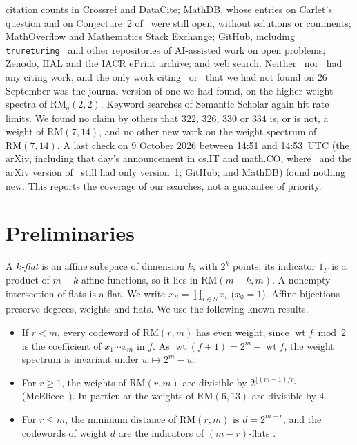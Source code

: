 \documentclass[11pt]{article}
\theoremstyle{remark}
\newcommand{\RM}{\mathrm{RM}}
\DeclareMathOperator{\wt}{wt}
\begin{document}
citation counts in Crossref and DataCite; MathDB, whose entries on Carlet's
question and on Conjecture~2 of~\cite{lw} were still open, without solutions
or comments; MathOverflow and Mathematics Stack Exchange; GitHub, including
\texttt{trureturing}~\cite{tru} and other repositories of AI-assisted work on
open problems; Zenodo, HAL and the IACR ePrint archive; and web search.
Neither~\cite{la} nor~\cite{lw2} had any citing work, and the only work
citing~\cite{lw} or~\cite{c24} that we had not found on 26 September was the
journal version of one we had found, on the higher weight spectra of
$\RM_q(2,2)$. Keyword searches of Semantic Scholar again hit rate limits. We
found no claim by others that $322$, $326$, $330$ or $334$ is, or is not, a
weight of $\RM(7,14)$, and no other new work on the weight spectrum of
$\RM(7,14)$. A last check on 9 October 2026 between 14:51 and 14:53~UTC (the
arXiv, including that day's announcement in cs.IT and math.CO, where~\cite{la}
and the arXiv version of~\cite{lw} still had only version~1; GitHub; and
MathDB) found nothing new.
This reports the coverage of our searches, not a guarantee of priority.

\section{Preliminaries}\label{sec:prelim}
A \emph{$k$-flat} is an affine subspace of dimension $k$, with $2^k$ points; its
indicator $1_F$ is a product of $m-k$ affine functions, so it lies in
$\RM(m-k,m)$. A nonempty intersection of flats is a flat. We write
$x_S=\prod_{i\in S}x_i$ ($x_\emptyset=1$). Affine bijections preserve degrees,
weights and flats. We use the following known results.

{\setlength{\leftmargini}{3.2em}%
\begin{itemize}
\item[(P1)] If $r<m$, every codeword of $\RM(r,m)$ has even weight, since
$\wt f\bmod2$ is the coefficient of $x_1\cdots x_m$ in $f$. As
$\wt(f+1)=2^m-\wt f$, the weight spectrum is invariant under $w\mapsto2^m-w$.
\item[(P2)] For $r\ge1$, the weights of $\RM(r,m)$ are divisible by
$2^{\lfloor(m-1)/r\rfloor}$ (McEliece~\cite{mc}). In particular the weights of
$\RM(6,13)$ are divisible by $4$.
\item[(P3)] For $r\le m$, the minimum distance of $\RM(r,m)$ is $d=2^{m-r}$, and
the codewords of weight $d$ are the indicators of $(m-r)$-flats
\cite[Chapter~13]{ms}.
\end{itemize}}
\end{document}
